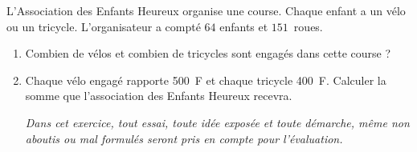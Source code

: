 
\medskip

L'Association des Enfants Heureux organise une course. Chaque
enfant a un vélo ou un tricycle. L'organisateur a compté $64$ enfants et
$151$~roues.

\medskip

\begin{enumerate}
\item Combien de vélos et combien de tricycles sont engagés dans
cette course ?
\item Chaque vélo engagé rapporte 500~F et chaque tricycle 400~F. Calculer la
somme que l'association des Enfants Heureux recevra.

\emph{Dans cet exercice, tout essai, toute idée exposée et toute démarche, même non aboutis ou mal formulés seront pris en compte pour l'évaluation.}
\end{enumerate}

\vspace{0,5cm}

